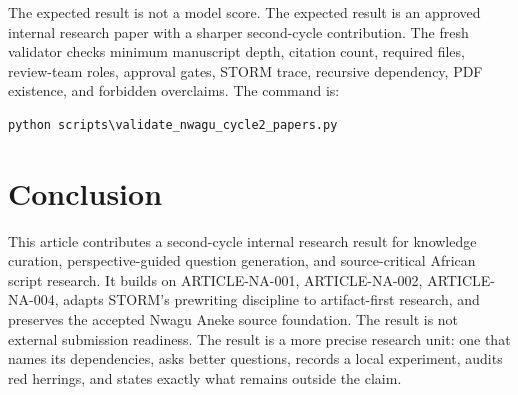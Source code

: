 \documentclass[sigconf,nonacm]{acmart}
\begin{document}
The expected result is not a model score. The expected result is an approved
internal research paper with a sharper second-cycle contribution. The fresh
validator checks minimum manuscript depth, citation count, required files,
review-team roles, approval gates, STORM trace, recursive dependency, PDF
existence, and forbidden overclaims. The command is:
\begin{verbatim}
python scripts\validate_nwagu_cycle2_papers.py
\end{verbatim}

\section{Conclusion}
This article contributes a second-cycle internal research result for knowledge curation, perspective-guided question generation, and source-critical African script research. It
builds on ARTICLE-NA-001, ARTICLE-NA-002, ARTICLE-NA-004, adapts STORM's prewriting discipline to artifact-first
research, and preserves the accepted Nwagu Aneke source foundation. The result
is not external submission readiness. The result is a more precise research unit:
one that names its dependencies, asks better questions, records a local
experiment, audits red herrings, and states exactly what remains outside the
claim.



\end{document}
